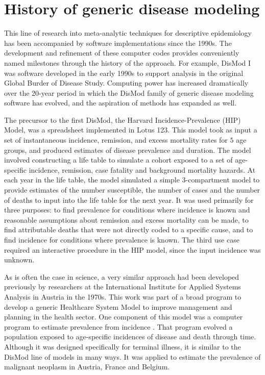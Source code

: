 \section{History of generic disease modeling}

This line of research into meta-analytic techniques for descriptive
epidemiology has been accompanied by software implementations since
the 1990s.  The development and refinement of these computer codes
provides conveniently named milestones through the history of the
approach.  For example, DisMod I was software developed in the early
1990s to support analysis in the original Global Burder of Disease
Study.  Computing power has increased dramatically over the 20-year
period in which the DisMod family of generic disease modeling software
has evolved, and the aspiration of methods has expanded as well.

The precursor to the first DisMod, the Harvard Incidence-Prevalence
(HIP) Model, was a spreadsheet implemented in Lotus 123.
\cite{Murray_Quantifying_1994} This model took as input a set of
instantaneous incidence, remission, and excess mortality rates for $5$
age groups, and produced estimates of disease prevalence and duration.
The model involved constructing a life table to simulate a cohort
exposed to a set of age-specific incidence, remission, case fatality
and background mortality hazards. At each year in the life table, the
model simulated a simple 3-compartment model to provide estimates of
the number susceptible, the number of cases and the number of deaths
to input into the life table for the next year.  It was used primarily
for three purposes: to find prevalence for conditions where incidence
is known and reasonable assumptions about remission and excess
mortality can be made, to find attributable deaths that were not
directly coded to a specific cause, and to find incidence for
conditions where prevalence is known.  The third use case required an
interactive procedure in the HIP model, since the input incidence was
unknown.

As is often the case in science, a very similar approach had been
developed previously by researchers at the International Institute
for Applied Systems Analysis in Austria in the 1970s. This work was
part of a broad program to develop a generic Healthcare System Model
to improve management and planning in the health sector. One component
of this model was a computer program to estimate prevalence from
incidence \cite{Klementiev_On_1977}. That program evolved a population
exposed to age-specific incidences of disease and death through time.
Although it was designed specifically for terminal illness, it is
similar to the DisMod line of models in many ways. It was applied to
estimate the prevalence of malignant neoplasm in Austria, France and
Belgium.


